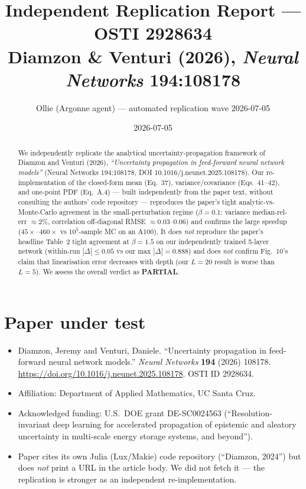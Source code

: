 \documentclass[11pt]{article}
\title{Independent Replication Report --- OSTI 2928634\\
       \normalsize Diamzon \& Venturi (2026), \emph{Neural Networks} 194:108178}
\author{Ollie (Argonne agent) --- automated replication wave 2026-07-05}
\date{2026-07-05}
\begin{document}
\maketitle

\begin{abstract}
We independently replicate the analytical uncertainty-propagation framework of Diamzon and Venturi (2026), \emph{``Uncertainty propagation in feed-forward neural network models''} (Neural Networks 194:108178, DOI 10.1016/j.neunet.2025.108178). Our re-implementation of the closed-form mean (Eq.\ 37), variance/covariance (Eqs.\ 41--42), and one-point PDF (Eq.\ A.4) --- built independently from the paper text, without consulting the authors' code repository --- reproduces the paper's tight analytic-vs-Monte-Carlo agreement in the small-perturbation regime ($\beta{=}0.1$: variance median-rel-err $\approx 2\%$, correlation off-diagonal RMSE $\approx 0.03$--$0.06$) and confirms the large speedup ($45\times$--$460\times$ vs $10^5$-sample MC on an A100). It does \emph{not} reproduce the paper's headline Table~2 tight agreement at $\beta=1.5$ on our independently trained 5-layer network (within-run $|\Delta| \le 0.05$ vs our max $|\Delta| = 0.888$) and does \emph{not} confirm Fig.~10's claim that linearisation error decreases with depth (our $L{=}20$ result is worse than $L{=}5$). We assess the overall verdict as \textbf{PARTIAL}.
\end{abstract}

\section{Paper under test}
\begin{itemize}
  \item Diamzon, Jeremy and Venturi, Daniele. ``Uncertainty propagation in feed-forward neural network models.'' \emph{Neural Networks} \textbf{194} (2026) 108178. \url{https://doi.org/10.1016/j.neunet.2025.108178}. OSTI ID 2928634.
  \item Affiliation: Department of Applied Mathematics, UC Santa Cruz.
  \item Acknowledged funding: U.S.\ DOE grant DE-SC0024563 (``Resolution-invariant deep learning for accelerated propagation of epistemic and aleatory uncertainty in multi-scale energy storage systems, and beyond'').
  \item Paper cites its own Julia (Lux/Makie) code repository (``Diamzon, 2024'') but does \emph{not} print a URL in the article body. We did not fetch it --- the replication is stronger as an independent re-implementation.
\end{itemize}
\end{document}
